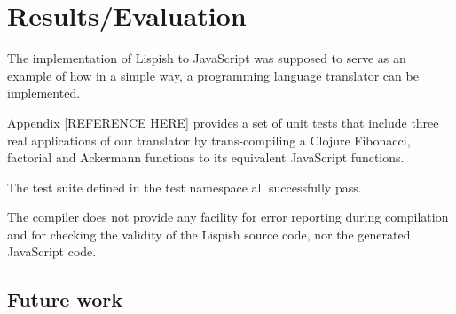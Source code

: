 \chapter{Results/Evaluation}
The implementation of Lispish to JavaScript was supposed to serve as an example of how in a simple way, a programming language translator can be implemented.

Appendix [REFERENCE HERE] provides a set of unit tests that include three real applications of our translator by trans-compiling a Clojure Fibonacci, factorial and Ackermann functions to its equivalent JavaScript functions.

The test suite defined in the test namespace all successfully pass. 

The compiler does not provide any facility for error reporting during compilation and for checking the validity of the Lispish source code, nor the generated JavaScript code.

\section{Future work}